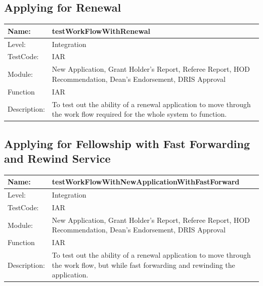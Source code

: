 \documentclass[12pt]{article}
\begin{document}
\subsection{Applying for Renewal}

\begin{center}
\begin{tabular}{|l|p{12cm}|}
\hline
 Name: & testWorkFlowWithRenewal  \\
\hline
Level: & Integration \\
\hline
TestCode: & IAR \\
\hline
Module:&  New Application, Grant Holder's Report, Referee Report, HOD Recommendation, Dean's Endorsement, DRIS Approval\\
\hline
Function & IAR \\
\hline
Description: & To test out the ability of a renewal application to move through the work flow required for the whole system to function. \\
\hline
\end{tabular}
\end{center}


\subsection{Applying for Fellowship with Fast Forwarding and Rewind Service}

\begin{center}
\begin{tabular}{|l|p{12cm}|}
\hline
 Name: & testWorkFlowWithNewApplicationWithFastForward  \\
\hline
Level: & Integration \\
\hline
TestCode: & IAR \\
\hline
Module:&  New Application, Grant Holder's Report, Referee Report, HOD Recommendation, Dean's Endorsement, DRIS Approval\\
\hline
Function & IAR \\
\hline
Description: & To test out the ability of a renewal application to move through the work flow, but while fast forwarding and rewinding the application. \\
\hline
\end{tabular}
\end{center}
\end{document}
